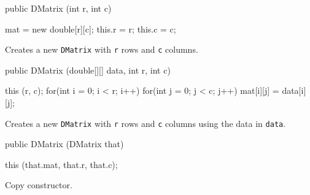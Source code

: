 \begin{code}
   public DMatrix (int r, int c) \begin{hide} {
      mat = new double[r][c];
      this.r = r;
      this.c = c;
   } \end{hide}
\end{code}
\begin{tabb} Creates a new \texttt{DMatrix} with \texttt{r} rows and
  \texttt{c} columns.
\end{tabb}
\begin{htmlonly}
\end{htmlonly}
\begin{code}

   public DMatrix (double[][] data, int r, int c) \begin{hide} {
      this (r, c);
      for(int i = 0; i < r; i++)
         for(int j = 0; j < c; j++)
         mat[i][j] = data[i][j];
   } \end{hide}
\end{code}
\begin{tabb} Creates a new \texttt{DMatrix} with \texttt{r} rows and
 \texttt{c} columns using the data in \texttt{data}.
\end{tabb}
\begin{htmlonly}
\end{htmlonly}
\begin{code}

   public DMatrix (DMatrix that) \begin{hide} {
      this (that.mat, that.r, that.c);
   } \end{hide}
\end{code}
\begin{tabb} Copy constructor.
\end{tabb}
\begin{htmlonly}
\end{htmlonly}

